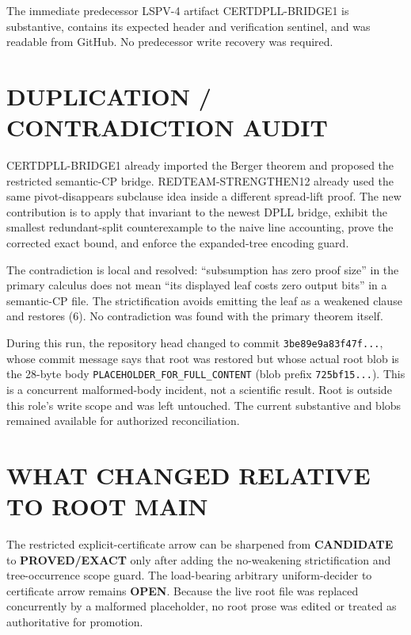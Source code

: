 \documentclass[11pt]{article}
\newcommand{\EXACT}{\textbf{PROVED/EXACT}}
\newcommand{\CAND}{\textbf{CANDIDATE}}
\newcommand{\OPEN}{\textbf{OPEN}}
\begin{document}
The immediate predecessor LSPV-4 artifact CERTDPLL-BRIDGE1 is substantive,
contains its expected header and verification sentinel, and was readable
from GitHub.  No predecessor write recovery was required.

\section{DUPLICATION / CONTRADICTION AUDIT}
CERTDPLL-BRIDGE1 already imported the Berger theorem and proposed the
restricted semantic-CP bridge.  REDTEAM-STRENGTHEN12 already used the same
pivot-disappears subclause idea inside a different spread-lift proof.  The new
contribution is to apply that invariant to the newest DPLL bridge, exhibit
the smallest redundant-split counterexample to the naive line accounting,
prove the corrected exact bound, and enforce the expanded-tree encoding
guard.

The contradiction is local and resolved: ``subsumption has zero proof size''
in the primary calculus does not mean ``its displayed leaf costs zero output
bits'' in a semantic-CP file.  The strictification avoids emitting the leaf
as a weakened clause and restores (6).  No contradiction was found with the
primary theorem itself.

During this run, the repository head changed to commit
\texttt{3be89e9a83f47f...}, whose commit message says that root
 was restored but whose actual root blob is the 28-byte body
\texttt{PLACEHOLDER\_FOR\_FULL\_CONTENT} (blob prefix
\texttt{725bf15...}).  This is a concurrent malformed-body incident, not a
scientific result.  Root  is outside this role's write scope
and was left untouched.  The current substantive  and
 blobs remained available for authorized reconciliation.

\section{WHAT CHANGED RELATIVE TO ROOT MAIN}
The restricted explicit-certificate arrow can be sharpened from
\CAND{} to \EXACT{} only after adding the no-weakening strictification and
tree-occurrence scope guard.  The load-bearing arbitrary uniform-decider to
certificate arrow remains \OPEN{}.  Because the live root file was replaced
concurrently by a malformed placeholder, no root prose was edited or treated
as authoritative for promotion.
\end{document}
